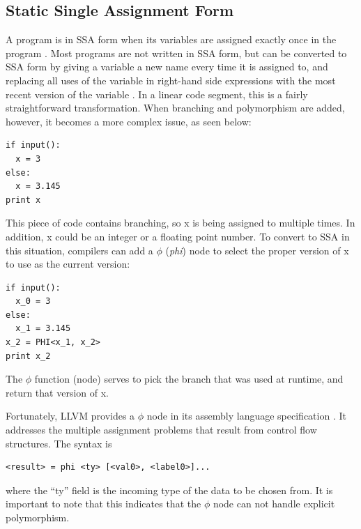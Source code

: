 \documentclass[11pt,twocolumn]{article}
\begin{document}


\subsection{Static Single Assignment Form}
\label{sec:SSAForm}

A program is in SSA form when its variables are assigned exactly once
in the program \cite{gcc-gnu.org}. Most programs are not written in
SSA form, but can be converted to SSA form by giving a variable a new
name every time it is assigned to, and replacing all uses of the
variable in right-hand side expressions with the most recent version
of the variable \cite{brandis-mossenbock}. In a linear code segment,
this is a fairly straightforward transformation. When branching and
polymorphism are added, however, it becomes a more complex issue, as
seen below:

\begin{verbatim}
if input():
  x = 3
else:
  x = 3.145
print x
\end{verbatim}

This piece of code contains branching, so x is being assigned to
multiple times. In addition, x could be an integer or a floating point
number. To convert to SSA in this situation, compilers can add a
$\phi$ (\textit{phi}) node to select the proper version of x to use as
the current version:

\begin{verbatim}
if input():
  x_0 = 3
else:
  x_1 = 3.145
x_2 = PHI<x_1, x_2>
print x_2
\end{verbatim}

The $\phi$ function (node) serves to pick the branch that was used at
runtime, and return that version of x.

Fortunately, LLVM provides a $\phi$ node in its assembly language
specification \cite{lattner-llvmlangref}. It addresses the multiple
assignment problems that result from control flow structures. The
syntax is

\begin{verbatim}
<result> = phi <ty> [<val0>, <label0>]...
\end{verbatim} 

where the ``ty'' field is the incoming type of the data to be chosen
from. It is important to note that this indicates that the $\phi$ node can not 
handle explicit polymorphism.
\end{document}
